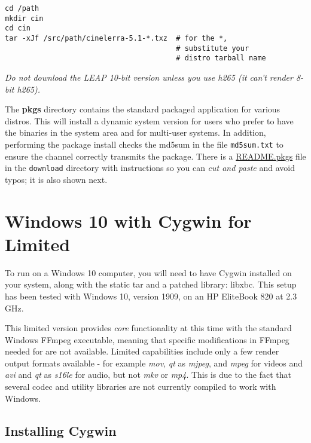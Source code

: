 \begin{lstlisting}[style=sh]
cd /path
mkdir cin
cd cin
tar -xJf /src/path/cinelerra-5.1-*.txz  # for the *,
                                        # substitute your
                                        # distro tarball name
\end{lstlisting}

\emph{Do not download the LEAP 10-bit version unless you use h265 (it
can't render 8-bit h265).}

The \textbf{pkgs} directory contains the standard packaged
application for various distros.  This will install a dynamic
system version for users who prefer to have the binaries in the
system area and for multi-user systems.
%
In addition, performing the package install checks the md5sum in
the file \texttt{md5sum.txt} to ensure the channel correctly
transmits the package.  There is a
\href{https://cinelerra-gg.org/download/README.pkgs}{README.pkgs}
file in the \texttt{download} directory with instructions so you
can \textit{cut and paste} and avoid typos; it is also shown
next.

\lstset{inputpath=extra/}


\section{Windows 10 with Cygwin for \CGG{} Limited}%
\label{sec:ms_windows10}

To run \CGG{} on a Windows 10 computer, you will need to have
Cygwin installed on your system, along with the \CGG{} static tar
and a patched library: libxbc.  This setup has been tested with
Windows 10, version 1909, on an HP EliteBook 820 at 2.3 GHz.

This limited version provides \textit{core} functionality at this
time with the standard Windows FFmpeg executable, meaning that
specific modifications in FFmpeg needed for \CGG{} are not
available.  Limited capabilities include only a few render output
formats available - for example \textit{mov}, \textit{qt} as
\textit{mjpeg}, and \textit{mpeg} for videos and \textit{avi} and
\textit{qt} as \textit{s16le} for audio, but not \textit{mkv} or
\textit{mp4}.  This is due to the fact that several codec and
utility libraries are not currently compiled to work with Windows.

\subsection*{Installing Cygwin}
\label{sec:installing_cygwin}

